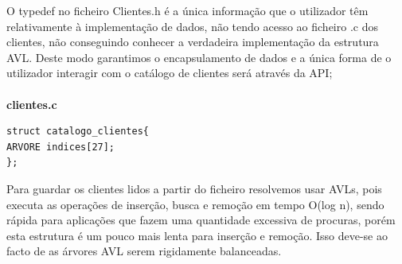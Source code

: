 O typedef no ficheiro Clientes.h é a única informação que o utilizador têm relativamente à implementação de dados, não tendo acesso ao ficheiro .c dos clientes, não conseguindo conhecer a verdadeira implementação da estrutura AVL. Deste modo garantimos o encapsulamento de dados e a única forma de o utilizador interagir com o catálogo de clientes será através da API; 


\paragraph{}
\textbf{clientes.c}
\begin{verbatim}
struct catalogo_clientes{
ARVORE indices[27];
};
\end{verbatim}

Para guardar os clientes lidos a partir do ficheiro resolvemos usar  AVLs, pois  executa as operações de inserção, busca e remoção em tempo O(log n), sendo rápida  para aplicações que fazem uma quantidade excessiva de procuras, porém esta estrutura é um pouco mais lenta para inserção e remoção. Isso deve-se ao facto de as árvores AVL serem rigidamente balanceadas.


